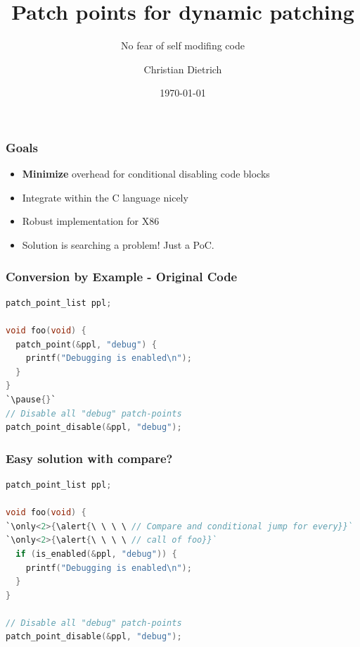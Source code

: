 \documentclass{beamer}
\begin{document}
\title{Patch points for dynamic patching}
\subtitle{No fear of self modifing code}
\author[cd]{Christian Dietrich}
\date{\today} 

\begin{frame}[plain]
\titlepage
\end{frame}


\begin{frame}\frametitle{Goals}
  \begin{itemize}
    \item<1-> \textbf{Minimize} overhead for conditional disabling code blocks \bigskip{}
    \item<2-> Integrate within the C language nicely \bigskip{}
    \item<3-> Robust implementation for X86  \bigskip{}
    \item<5-> Solution is searching a problem! Just a PoC.
  \end{itemize}
\end{frame}

\begin{frame}[fragile]\frametitle{Conversion by Example - Original Code} 
  \begin{lstlisting}[language=C,escapechar=`]
patch_point_list ppl;

void foo(void) {
  patch_point(&ppl, "debug") {
    printf("Debugging is enabled\n");
  }
}
`\pause{}`
// Disable all "debug" patch-points
patch_point_disable(&ppl, "debug");
\end{lstlisting}
\end{frame}

\begin{frame}[fragile]\frametitle{Easy solution with compare?}
  \begin{lstlisting}[language=C,escapechar=`]
patch_point_list ppl;

void foo(void) {
`\only<2>{\alert{\ \ \ \ // Compare and conditional jump for every}}`
`\only<2>{\alert{\ \ \ \ // call of foo}}`
  if (is_enabled(&ppl, "debug")) {
    printf("Debugging is enabled\n");
  }
}

// Disable all "debug" patch-points
patch_point_disable(&ppl, "debug");
  \end{lstlisting}
\pause
\end{frame}
\end{document}

